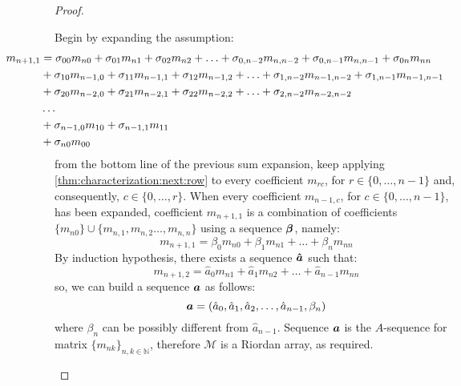 \begin{proof}
\begin{itemize}
            Begin by expanding the assumption:
            \begin{displaymath}
                \hspace{-2cm}
                \begin{split}
                    m_{n+1,1}&=\sigma_{00}m_{n0}+\sigma_{01}m_{n1}+\sigma_{02}m_{n2}+\ldots
                                +\sigma_{0,n-2}m_{n,n-2}+\sigma_{0,n-1}m_{n,n-1}+\sigma_{0n}m_{nn}\\
                             &+\sigma_{10}m_{n-1,0}+\sigma_{11}m_{n-1,1}+\sigma_{12}m_{n-1,2}+\ldots
                                +\sigma_{1,n-2}m_{n-1,n-2}+\sigma_{1,n-1}m_{n-1,n-1}\\
                             &+\sigma_{20}m_{n-2,0}+\sigma_{21}m_{n-2,1}+\sigma_{22}m_{n-2,2}+\ldots+\sigma_{2,n-2}m_{n-2,n-2}\\
                             &\ldots\\
                             &+\sigma_{n-1,0}m_{10}+\sigma_{n-1,1}m_{11}\\
                             &+\sigma_{n0}m_{00}\\
                \end{split}
            \end{displaymath}
            from the bottom line of the previous sum expansion, keep applying
            \autoref{thm:characterization:next:row} to every coefficient $m_{rc}$, for
            $r\in\lbrace0,\ldots,n-1\rbrace$ and, consequently, $c\in\lbrace0,\ldots,r\rbrace$.
            When every coefficient $m_{n-1,c}$, for $c\in\lbrace0,\ldots,n-1\rbrace$, has been
            expanded, coefficient $m_{n+1,1}$ is a combination of coefficients 
            $\lbrace m_{n0}\rbrace\cup\lbrace m_{n,1},m_{n,2}\ldots,m_{n,n}\rbrace$ using
            a sequence $\boldsymbol{\beta}$, namely:
            \begin{displaymath}
                m_{n+1,1}=\beta_{0}m_{n0}+\beta_{1}m_{n1}+\ldots+\beta_{n}m_{nn}
            \end{displaymath}
            By induction hypothesis, there exists a sequence $\boldsymbol{\hat{a}}$ such that:
            \begin{displaymath}
                m_{n+1,2}=\hat{a}_{0}m_{n1}+\hat{a}_{1}m_{n2}+\ldots+\hat{a}_{n-1}m_{nn}
            \end{displaymath}
            so, we can build a sequence $\boldsymbol{a}$ as follows:
            \begin{displaymath}
                \boldsymbol{a}=\left(\hat{a}_{0},\hat{a}_{1},\hat{a}_{2},\ldots,\hat{a}_{n-1},\beta_{n}\right)
            \end{displaymath}
            where $\beta_{n}$ can be possibly different from $\hat{a}_{n-1}$. 
            Sequence $\boldsymbol{a}$ is the $A$-sequence
            for matrix $\lbrace m_{nk}\rbrace_{n,k\in\mathbb{N}}$, therefore $\mathcal{M}$ is a Riordan
            array, as required.
    \end{itemize}
\end{proof}


















